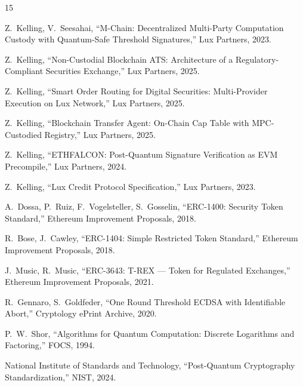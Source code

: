 \documentclass[11pt,a4paper]{article}
\begin{document}
\begin{thebibliography}{15}

Z.~Kelling, V.~Seesahai,
``M-Chain: Decentralized Multi-Party Computation Custody with Quantum-Safe Threshold Signatures,''
Lux Partners, 2023.

Z.~Kelling,
``Non-Custodial Blockchain ATS: Architecture of a Regulatory-Compliant Securities Exchange,''
Lux Partners, 2025.

Z.~Kelling,
``Smart Order Routing for Digital Securities: Multi-Provider Execution on Lux Network,''
Lux Partners, 2025.

Z.~Kelling,
``Blockchain Transfer Agent: On-Chain Cap Table with MPC-Custodied Registry,''
Lux Partners, 2025.

Z.~Kelling,
``ETHFALCON: Post-Quantum Signature Verification as EVM Precompile,''
Lux Partners, 2024.

Z.~Kelling,
``Lux Credit Protocol Specification,''
Lux Partners, 2023.

A.~Dossa, P.~Ruiz, F.~Vogelsteller, S.~Gosselin,
``ERC-1400: Security Token Standard,''
Ethereum Improvement Proposals, 2018.

R.~Bose, J.~Cawley,
``ERC-1404: Simple Restricted Token Standard,''
Ethereum Improvement Proposals, 2018.

J.~Music, R.~Music,
``ERC-3643: T-REX --- Token for Regulated Exchanges,''
Ethereum Improvement Proposals, 2021.

R.~Gennaro, S.~Goldfeder,
``One Round Threshold ECDSA with Identifiable Abort,''
Cryptology ePrint Archive, 2020.

P.~W.~Shor,
``Algorithms for Quantum Computation: Discrete Logarithms and Factoring,''
FOCS, 1994.

{National Institute of Standards and Technology},
``Post-Quantum Cryptography Standardization,''
NIST, 2024.

\end{thebibliography}
\end{document}
